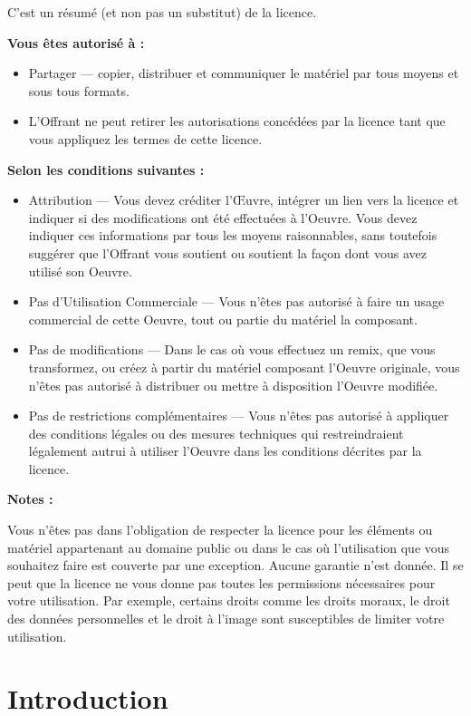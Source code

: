 \documentclass[]{book}
\providecommand{\tightlist}{%
  \setlength{\itemsep}{0pt}\setlength{\parskip}{0pt}}
\begin{document}
C'est un résumé (et non pas un substitut) de la licence.

\textbf{Vous êtes autorisé à :}

\begin{itemize}
\tightlist
\item
  Partager --- copier, distribuer et communiquer le matériel par tous moyens et sous tous formats.
\item
  L'Offrant ne peut retirer les autorisations concédées par la licence tant que vous appliquez les termes de cette licence.
\end{itemize}

\textbf{Selon les conditions suivantes :}

\begin{itemize}
\item
  Attribution --- Vous devez créditer l'Œuvre, intégrer un lien vers la licence et indiquer si des modifications ont été effectuées à l'Oeuvre. Vous devez indiquer ces informations par tous les moyens raisonnables, sans toutefois suggérer que l'Offrant vous soutient ou soutient la façon dont vous avez utilisé son Oeuvre.
\item
  Pas d'Utilisation Commerciale --- Vous n'êtes pas autorisé à faire un usage commercial de cette Oeuvre, tout ou partie du matériel la composant.
\item
  Pas de modifications --- Dans le cas où vous effectuez un remix, que vous transformez, ou créez à partir du matériel composant l'Oeuvre originale, vous n'êtes pas autorisé à distribuer ou mettre à disposition l'Oeuvre modifiée.
\item
  Pas de restrictions complémentaires --- Vous n'êtes pas autorisé à appliquer des conditions légales ou des mesures techniques qui restreindraient légalement autrui à utiliser l'Oeuvre dans les conditions décrites par la licence.
\end{itemize}

\textbf{Notes :}

Vous n'êtes pas dans l'obligation de respecter la licence pour les éléments ou matériel appartenant au domaine public ou dans le cas où l'utilisation que vous souhaitez faire est couverte par une exception.
Aucune garantie n'est donnée. Il se peut que la licence ne vous donne pas toutes les permissions nécessaires pour votre utilisation. Par exemple, certains droits comme les droits moraux, le droit des données personnelles et le droit à l'image sont susceptibles de limiter votre utilisation.

\hypertarget{intro}{%
\chapter{Introduction}\label{intro}}
\end{document}
